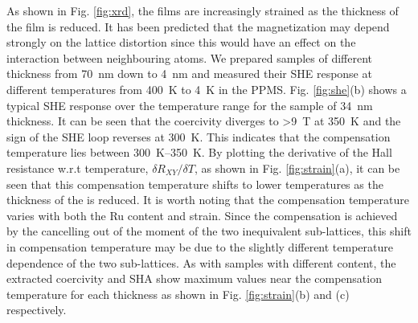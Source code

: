 \documentclass[reprint,aip,apl,floatfix,linenumbers,superscriptaddress]{revtex4-1}
\begin{document}
As shown in Fig. \ref{fig:xrd}, the  films are increasingly strained as the thickness of the film is reduced. It has been predicted that the magnetization may depend strongly on the lattice distortion since this would have an effect on the interaction between neighbouring  atoms. We prepared  samples of different thickness from \SI{70}{\nano\metre} down to \SI{4}{\nano\metre} and measured their SHE response at different temperatures from \SI{400}{\kelvin} to \SI{4}{\kelvin} in the PPMS. Fig. \ref{fig:she}(b) shows a typical SHE response over the temperature range for the sample of \SI{34}{\nano\metre} thickness. It can be seen that the coercivity diverges to >\SI{9}{\tesla} at \SI{350}{\kelvin} and the sign of the SHE loop reverses at \SI{300}{\kelvin}. This indicates that the compensation temperature lies between \SIrange{300}{350}{\kelvin}.  By plotting the derivative of the Hall resistance w.r.t temperature, $\delta R_{XY}/\delta T$, as shown in Fig. \ref{fig:strain}(a), it can be seen that this compensation temperature shifts to lower temperatures as the thickness of the  is reduced. It is worth noting that the compensation temperature varies with both the Ru content and strain. Since the compensation is achieved by the cancelling out of the moment of the two inequivalent  sub-lattices, this shift in compensation temperature may be due to the slightly different temperature dependence of the two sub-lattices. As with samples with different  content, the extracted coercivity and SHA show maximum values near the compensation temperature for each thickness as shown in Fig. \ref{fig:strain}(b) and (c) respectively.
\end{document}
